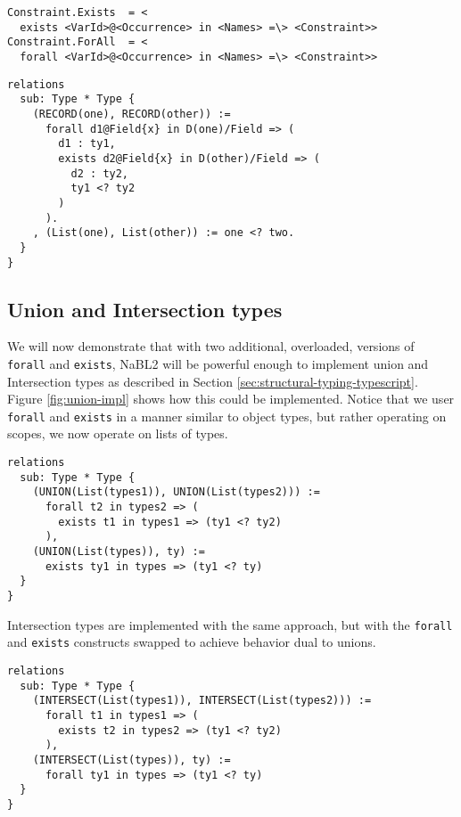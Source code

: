 \begin{figure*}
\begin{lstlisting}
Constraint.Exists  = <
  exists <VarId>@<Occurrence> in <Names> =\> <Constraint>>
Constraint.ForAll  = <
  forall <VarId>@<Occurrence> in <Names> =\> <Constraint>>
\end{lstlisting}
\caption{New constraint syntax constructs for NaBL2.}
\label{fig:nabl-syntax-proposal-constraint}
\end{figure*}

\begin{figure*}
\begin{lstlisting}
relations
  sub: Type * Type {
    (RECORD(one), RECORD(other)) :=
      forall d1@Field{x} in D(one)/Field => (
        d1 : ty1,
        exists d2@Field{x} in D(other)/Field => (
          d2 : ty2,
          ty1 <? ty2
        )
      ).
    , (List(one), List(other)) := one <? two.
  }
}
\end{lstlisting}
\caption{Example usage of the new syntax constructs for structural types.}
\label{fig:nabl-syntax-proposal-usage}
\end{figure*}

\subsection{Union and Intersection types}
We will now demonstrate that with two additional, overloaded, versions of \texttt{forall} and \texttt{exists},
NaBL2 will be powerful enough to implement union and Intersection types as described in Section \ref{sec:structural-typing-typescript}.
Figure \ref{fig:union-impl} shows how this could be implemented.
Notice that we user \texttt{forall} and \texttt{exists} in a manner similar to object types, 
but rather operating on scopes, we now operate on lists of types.

\begin{figure*}
\begin{lstlisting}
relations
  sub: Type * Type {
    (UNION(List(types1)), UNION(List(types2))) :=
      forall t2 in types2 => (
        exists t1 in types1 => (ty1 <? ty2)
      ),
    (UNION(List(types)), ty) :=
      exists ty1 in types => (ty1 <? ty)
  }
}
\end{lstlisting}
\caption{Implementation of union types by using a custom subtype relation and overloaded \texttt{forall} and \texttt{exists} constraints.}
\label{fig:union-impl}
\end{figure*}

Intersection types are implemented with the same approach, but with the \texttt{forall} and \texttt{exists} constructs swapped to achieve behavior dual to unions.

\begin{figure*}
\begin{lstlisting}
relations
  sub: Type * Type {
    (INTERSECT(List(types1)), INTERSECT(List(types2))) :=
      forall t1 in types1 => (
        exists t2 in types2 => (ty1 <? ty2)
      ),
    (INTERSECT(List(types)), ty) :=
      forall ty1 in types => (ty1 <? ty)
  }
}
\end{lstlisting}
\caption{Intersection types, using the same constructs as with union types.}
\label{fig:intersect-impl}
\end{figure*}